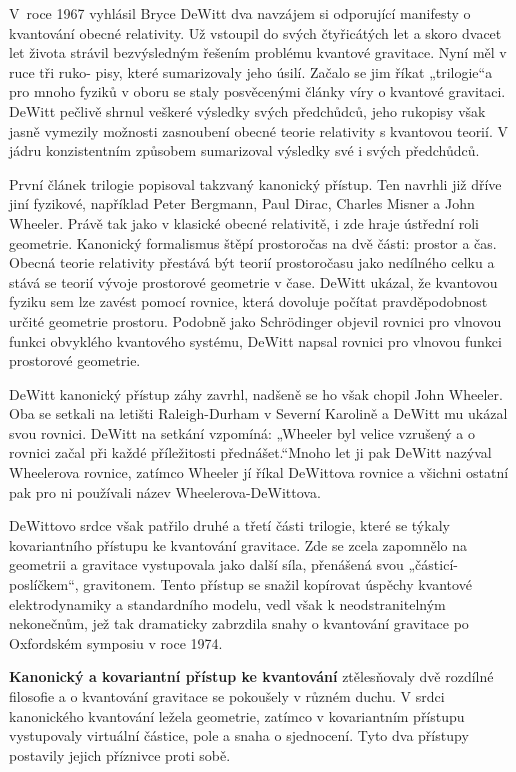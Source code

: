   V roce 1967 vyhlásil Bryce DeWitt dva navzájem si odporující manifesty o kvantování obecné
  relativity. Už vstoupil do svých čtyřicátých let a skoro dvacet let života strávil bezvýsledným
  řešením problému kvantové gravitace. Nyní měl v ruce tři ruko- pisy, které sumarizovaly jeho
  úsilí. Začalo se jim říkat „trilogie“a pro mnoho fyziků v oboru se staly posvěcenými články víry o
  kvantové gravitaci. DeWitt pečlivě shrnul veškeré výsledky svých předchůdců, jeho rukopisy však
  jasně vymezily možnosti zasnoubení obecné teorie relativity s kvantovou teorií. V jádru
  konzistentním způsobem sumarizoval výsledky své i svých předchůdců. 
  
  První článek trilogie popisoval takzvaný kanonický přístup. Ten navrhli již dříve jiní fyzikové,
  například Peter Bergmann, Paul Dirac, Charles Misner a John Wheeler. Právě tak jako v klasické
  obecné relativitě, i zde hraje ústřední roli geometrie. Kanonický formalismus štěpí prostoročas na
  dvě části: prostor a čas. Obecná teorie relativity přestává být teorií prostoročasu jako nedílného
  celku a stává se teorií vývoje prostorové geometrie v čase. DeWitt ukázal, že kvantovou fyziku sem
  lze zavést pomocí rovnice, která dovoluje počítat pravděpodobnost určité geometrie prostoru.
  Podobně jako Schrödinger objevil rovnici pro vlnovou funkci obvyklého kvantového systému, DeWitt
  napsal rovnici pro vlnovou funkci prostorové geometrie. 
  
  DeWitt kanonický přístup záhy zavrhl, nadšeně se ho však chopil John Wheeler. Oba se setkali na
  letišti Raleigh-Durham v Severní Karolině a DeWitt mu ukázal svou rovnici. DeWitt na setkání
  vzpomíná: „Wheeler byl velice vzrušený a o rovnici začal při každé příležitosti přednášet.“Mnoho
  let ji pak DeWitt nazýval Wheelerova rovnice, zatímco Wheeler jí říkal DeWittova rovnice a všichni
  ostatní pak pro ni používali název Wheelerova-DeWittova. 
  
  DeWittovo srdce však patřilo druhé a třetí části trilogie, které se týkaly kovariantního přístupu
  ke kvantování gravitace. Zde se zcela zapomnělo na geometrii a gravitace vystupovala jako další
  síla, přenášená svou „částicí-poslíčkem“, gravitonem. Tento přístup se snažil kopírovat úspěchy
  kvantové elektrodynamiky a standardního modelu, vedl však k neodstranitelným nekonečnům, jež tak
  dramaticky zabrzdila snahy o kvantování gravitace po Oxfordském symposiu v roce 1974. 
  
  \textbf{Kanonický a kovariantní přístup ke kvantování} ztělesňovaly dvě rozdílné filosofie a o
  kvantování gravitace se pokoušely v různém duchu. V srdci kanonického kvantování ležela geometrie,
  zatímco v kovariantním přístupu vystupovaly virtuální částice, pole a snaha o sjednocení. Tyto dva
  přístupy postavily jejich příznivce proti sobě. 
  
